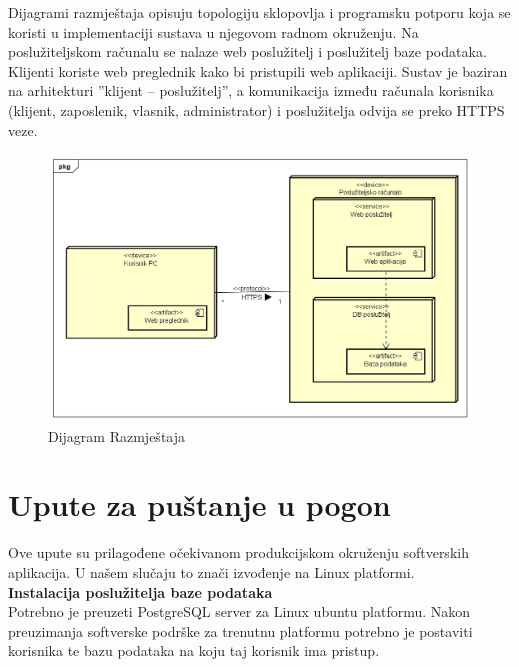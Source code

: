 			Dijagrami razmještaja opisuju topologiju sklopovlja i programsku potporu koja se koristi u implementaciji sustava u njegovom radnom okruženju. Na poslužiteljskom računalu se nalaze web poslužitelj i poslužitelj baze podataka. Klijenti koriste web preglednik kako bi pristupili web aplikaciji. Sustav je baziran na arhitekturi ”klijent – poslužitelj”, a komunikacija između računala korisnika (klijent, zaposlenik, vlasnik, administrator) i poslužitelja odvija se preko HTTPS veze.
			
			
			\begin{figure}[H]
				\includegraphics[width=\textwidth]{slike/DijagramRazmjestaja.png} %
				\caption{Dijagram Razmještaja}
				\label{fig:DijagramRazmještaja} %
			\end{figure}
			
			\eject 
		
		\section{Upute za puštanje u pogon}
		
		
			
			Ove upute su prilagođene očekivanom produkcijskom okruženju softverskih aplikacija. U našem slučaju to znači izvođenje na Linux platformi.\\
			
			\noindent \textbf{Instalacija poslužitelja baze podataka}\\
			
			\noindent Potrebno je preuzeti PostgreSQL server za Linux ubuntu platformu.
			Nakon preuzimanja softverske podrške za trenutnu platformu potrebno je postaviti korisnika te bazu podataka na koju taj korisnik ima pristup.\newline
			
